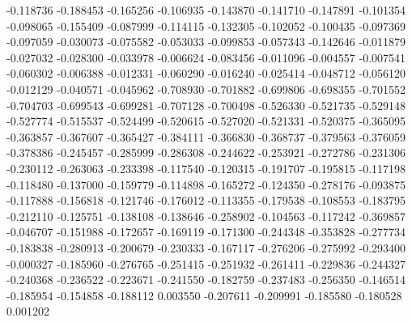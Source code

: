 -0.118736
-0.188453
-0.165256
-0.106935
-0.143870
-0.141710
-0.147891
-0.101354
-0.098065
-0.155409
-0.087999
-0.114115
-0.132305
-0.102052
-0.100435
-0.097369
-0.097059
-0.030073
-0.075582
-0.053033
-0.099853
-0.057343
-0.142646
-0.011879
-0.027032
-0.028300
-0.033978
-0.006624
-0.083456
-0.011096
-0.004557
-0.007541
-0.060302
-0.006388
-0.012331
-0.060290
-0.016240
-0.025414
-0.048712
-0.056120
-0.012129
-0.040571
-0.045962
-0.708930
-0.701882
-0.699806
-0.698355
-0.701552
-0.704703
-0.699543
-0.699281
-0.707128
-0.700498
-0.526330
-0.521735
-0.529148
-0.527774
-0.515537
-0.524499
-0.520615
-0.527020
-0.521331
-0.520375
-0.365095
-0.363857
-0.367607
-0.365427
-0.384111
-0.366830
-0.368737
-0.379563
-0.376059
-0.378386
-0.245457
-0.285999
-0.286308
-0.244622
-0.253921
-0.272786
-0.231306
-0.230112
-0.263063
-0.233398
-0.117540
-0.120315
-0.191707
-0.195815
-0.117198
-0.118480
-0.137000
-0.159779
-0.114898
-0.165272
-0.124350
-0.278176
-0.093875
-0.117888
-0.156818
-0.121746
-0.176012
-0.113355
-0.179538
-0.108553
-0.183795
-0.212110
-0.125751
-0.138108
-0.138646
-0.258902
-0.104563
-0.117242
-0.369857
-0.046707
-0.151988
-0.172657
-0.169119
-0.171300
-0.244348
-0.353828
-0.277734
-0.183838
-0.280913
-0.200679
-0.230333
-0.167117
-0.276206
-0.275992
-0.293400
-0.000327
-0.185960
-0.276765
-0.251415
-0.251932
-0.261411
-0.229836
-0.244327
-0.240368
-0.236522
-0.223671
-0.241550
-0.182759
-0.237483
-0.256350
-0.146514
-0.185954
-0.154858
-0.188112
0.003550
-0.207611
-0.209991
-0.185580
-0.180528
0.001202
